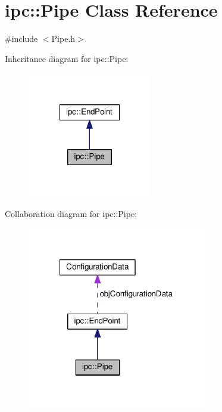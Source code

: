 \hypertarget{classipc_1_1Pipe}{}\section{ipc\+:\+:Pipe Class Reference}
\label{classipc_1_1Pipe}


{\ttfamily \#include $<$Pipe.\+h$>$}



Inheritance diagram for ipc\+:\+:Pipe\+:
\nopagebreak
\begin{figure}[H]
\begin{center}
\leavevmode
\includegraphics[width=154pt]{classipc_1_1Pipe__inherit__graph}
\end{center}
\end{figure}


Collaboration diagram for ipc\+:\+:Pipe\+:
\nopagebreak
\begin{figure}[H]
\begin{center}
\leavevmode
\includegraphics[width=222pt]{classipc_1_1Pipe__coll__graph}
\end{center}
\end{figure}
